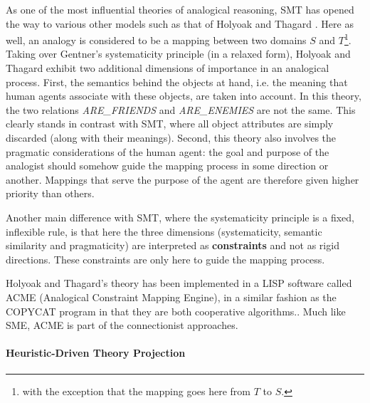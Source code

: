 As one of the most influential theories of analogical reasoning, SMT has opened
the way to various other models such as that of Holyoak and Thagard
\cite{HolTha89}. Here as well, an analogy is considered to be a mapping between
two domains $S$ and $T$\footnote{with the exception that the mapping goes here
from $T$ to $S$.}. Taking over Gentner's systematicity principle (in a relaxed
form), Holyoak and Thagard exhibit two additional dimensions of importance in
an analogical process. First, the semantics behind the objects at hand, i.e.
the meaning that human agents associate with these objects, are taken into
account. In this theory, the two relations \textit{ARE\_FRIENDS} and
\textit{ARE\_ENEMIES} are not the same. This clearly stands in contrast with
SMT, where all object attributes are simply discarded (along with their
meanings). Second, this theory also involves
the pragmatic considerations of the human agent: the goal and purpose of the
analogist should somehow guide the mapping process in some direction or
another. Mappings that serve the purpose of the agent are therefore given
higher priority than others.

Another main difference with SMT, where the systematicity principle is a fixed,
inflexible rule, is that here the three dimensions (systematicity, semantic
similarity and pragmaticity) are interpreted as \textbf{constraints} and not as
rigid directions. These constraints are only here to guide the mapping process.

Holyoak and Thagard's theory has been implemented in a LISP software called
ACME (Analogical Constraint Mapping Engine), in a similar fashion as the
COPYCAT program in that they are both cooperative algorithms.. Much like SME, ACME is part of the connectionist approaches.

\paragraph{Heuristic-Driven Theory Projection\\}

